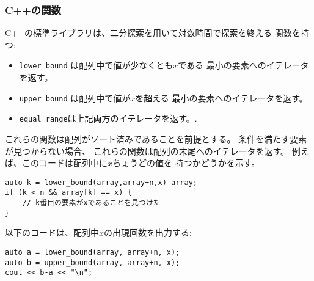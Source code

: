 \subsubsection{C++の関数}

C++の標準ライブラリは、二分探索を用いて対数時間で探索を終える
関数を持つ:

\begin{itemize}
\item \texttt{lower\_bound} は配列中で値が少なくとも$x$である
最小の要素へのイテレータを返す。
\item \texttt{upper\_bound} は配列中で値が$x$を超える
最小の要素へのイテレータを返す。
\item \texttt{equal\_range}は上記両方のイテレータを返す。.
\end{itemize}

\begin{comment}
The functions assume that the array is sorted.
If there is no such element, the pointer points to
the element after the last array element.
For example, the following code finds out whether
an array contains an element with value $x$:

\begin{lstlisting}
auto k = lower_bound(array,array+n,x)-array;
if (k < n && array[k] == x) {
    // x found at index k
}
\end{lstlisting}

Then, the following code counts the number of elements
whose value is $x$:

\end{comment}

これらの関数は配列がソート済みであることを前提とする。
条件を満たす要素が見つからない場合、
これらの関数は配列の末尾へのイテレータを返す。
例えば、このコードは配列中に$x$ちょうどの値を
持つかどうかを示す。

\begin{lstlisting}
auto k = lower_bound(array,array+n,x)-array;
if (k < n && array[k] == x) {
    // k番目の要素がxであることを見つけた
}
\end{lstlisting}

以下のコードは、配列中$x$の出現回数を出力する:

\begin{lstlisting}
auto a = lower_bound(array, array+n, x);
auto b = upper_bound(array, array+n, x);
cout << b-a << "\n";
\end{lstlisting}

\begin{comment}
Using \texttt{equal\_range}, the code becomes shorter:
\end{comment}

